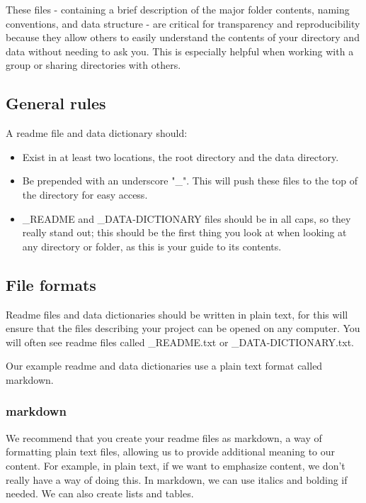 \documentclass[
]{book}
\providecommand{\tightlist}{%
  \setlength{\itemsep}{0pt}\setlength{\parskip}{0pt}}
\begin{document}
These files - containing a brief description of the major folder contents, naming conventions, and data structure - are critical for transparency and reproducibility because they allow others to easily understand the contents of your directory and data without needing to ask you. This is especially helpful when working with a group or sharing directories with others.

\hypertarget{general-rules}{%
\subsection*{General rules}\label{general-rules}}

A readme file and data dictionary should:

\begin{itemize}
\tightlist
\item
  Exist in at least two locations, the root directory and the data directory.
\item
  Be prepended with an underscore "\_". This will push these files to the top of the directory for easy access.
\item
  \_README and \_DATA-DICTIONARY files should be in all caps, so they really stand out; this should be the first thing you look at when looking at any directory or folder, as this is your guide to its contents.
\end{itemize}

\hypertarget{file-formats}{%
\subsection*{File formats}\label{file-formats}}

Readme files and data dictionaries should be written in plain text, for this will ensure that the files describing your project can be opened on any computer. You will often see readme files called \_README.txt or \_DATA-DICTIONARY.txt.

Our example readme and data dictionaries use a plain text format called markdown.

\hypertarget{markdown}{%
\subsubsection*{markdown}\label{markdown}}

We recommend that you create your readme files as markdown, a way of formatting plain text files, allowing us to provide additional meaning to our content. For example, in plain text, if we want to emphasize content, we don't really have a way of doing this. In markdown, we can use italics and bolding if needed. We can also create lists and tables.
\end{document}

